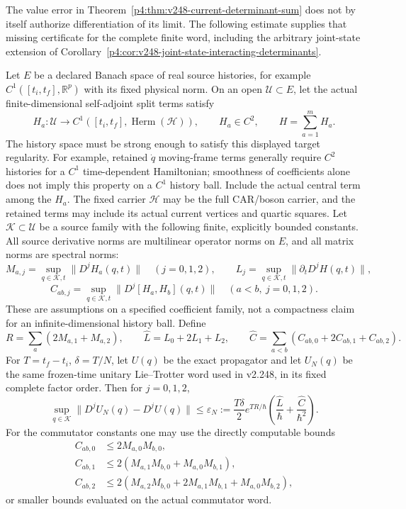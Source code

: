 \documentclass[12pt,a4paper]{article}
\begin{document}
The value error in Theorem~\ref{p4:thm:v248-current-determinant-sum}
does not by itself authorize differentiation of its limit. The following
estimate supplies that missing certificate for the complete finite word,
including the arbitrary joint-state extension of
Corollary~\ref{p4:cor:v248-joint-state-interacting-determinants}.

\begin{theorem}
\label{p4:thm:v249-interacting-two-jet-convergence}
Let $E$ be a declared Banach space of real source histories, for example
$C^1([t_i,t_f],\mathbb R^p)$ with its fixed physical norm. On an open
$\mathcal U\subset E$, let the actual finite-dimensional self-adjoint
split terms satisfy
\[
 H_a:\mathcal U\longrightarrow
       C^1([t_i,t_f],\operatorname{Herm}(\mathcal H)),\qquad
 H_a\in C^2,\qquad H=\sum_{a=1}^mH_a.
\]
The history space must be strong enough to satisfy this displayed target
regularity. For example, retained $\dot q$ moving-frame terms generally
require $C^2$ histories for a $C^1$ time-dependent Hamiltonian; smoothness
of coefficients alone does not imply this property on a $C^1$ history ball.
Include the actual central term among the $H_a$. The fixed carrier
$\mathcal H$ may be the full CAR/boson carrier, and the retained terms
may include its actual current vertices and quartic squares. Let
$\mathcal K\subset\mathcal U$ be a source family with the following
finite, explicitly bounded constants. All source derivative norms are
multilinear operator norms on $E$, and all matrix norms are spectral norms:
\[
 M_{a,j}=\sup_{q\in\mathcal K,t}\|D^jH_a(q,t)\|\quad(j=0,1,2),
 \qquad L_j=\sup_{q\in\mathcal K,t}
                      \|\partial_tD^jH(q,t)\|,
\]
\[
 C_{ab,j}=\sup_{q\in\mathcal K,t}
                    \|D^j[H_a,H_b](q,t)\|\quad(a<b,\ j=0,1,2).
\]
These are assumptions on a specified coefficient family, not a compactness
claim for an infinite-dimensional history ball. Define
\[
 R=\sum_a(2M_{a,1}+M_{a,2}),\qquad
 \widehat L=L_0+2L_1+L_2,\qquad
 \widehat C=\sum_{a<b}(C_{ab,0}+2C_{ab,1}+C_{ab,2}).
\]
For $T=t_f-t_i$, $\delta=T/N$, let $U(q)$ be the exact propagator and
let $U_N(q)$ be the same frozen-time unitary Lie--Trotter word used in
v2.248, in its fixed complete factor order. Then for $j=0,1,2$,
\begin{equation}
 \boxed{\sup_{q\in\mathcal K}\|D^jU_N(q)-D^jU(q)\|
 \le\varepsilon_N:=\frac{T\delta}{2}e^{TR/\hbar}
              \left(\frac{\widehat L}{\hbar}
                           +\frac{\widehat C}{\hbar^2}\right).}
 \label{p4:eq:v249-propagator-two-jet-error}
\end{equation}
For the commutator constants one may use the directly computable bounds
\begin{align*}
 C_{ab,0}&\le2M_{a,0}M_{b,0},\\
 C_{ab,1}&\le2(M_{a,1}M_{b,0}+M_{a,0}M_{b,1}),\\
 C_{ab,2}&\le2(M_{a,2}M_{b,0}+2M_{a,1}M_{b,1}
                                      +M_{a,0}M_{b,2}),
\end{align*}
or smaller bounds evaluated on the actual commutator word.
\end{theorem}
\end{document}
